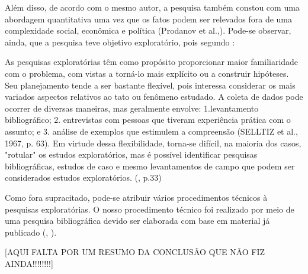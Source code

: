   	Além disso, de acordo com o mesmo autor, a pesquisa também constou com uma abordagem quantitativa uma vez que os fatos podem ser relevados fora de uma complexidade social, econômica e política (Prodanov et al.,\citeyear{profreitas}). 
  	Pode-se observar, ainda, que a pesquisa teve objetivo exploratório, pois segundo \citeauthor{gil}:
  	
  	\begin{citlon}
  		As pesquisas exploratórias têm como propósito proporcionar maior familiaridade com o problema, com vistas a torná-lo mais explícito ou a construir hipóteses. 
  		Seu planejamento tende a ser bastante flexível, pois interessa considerar os mais variados aspectos relativos ao tato ou fenômeno estudado.
  		A coleta de dados pode ocorrer de diversas maneiras, mas geralmente envolve: 1.levantamento bibliográfico;
  		2. entrevistas com pessoas que tiveram experiência prática com o assunto; 
  		e 3. análise de exemplos que estimulem a compreensão (SELLTIZ et al., 1967, p. 63). 
  		Em virtude dessa flexibilidade, torna-se difícil, na maioria dos casos, "rotular" os estudos exploratórios, mas é possível identificar pesquisas bibliográficas, estudos de caso e mesmo levantamentos de campo que podem ser considerados estudos exploratórios. (\citeyear{gil}, p.33)
  	\end{citlon}
  	
  	Como fora supracitado, pode-se atribuir vários procedimentos técnicos à pesquisas exploratórias. 
  	O nosso procedimento técnico foi realizado por meio de uma pesquisa bibliográfica devido ser elaborada com base em material já publicado (\citeauthor{gil}, \citeyear{gil}).
  	
  	
    [AQUI FALTA POR UM RESUMO DA CONCLUSÃO QUE NÃO FIZ AINDA!!!!!!!!]
    
    
    
    
    
    
    
    
    
    
    
    
    
    
    
    
    
    